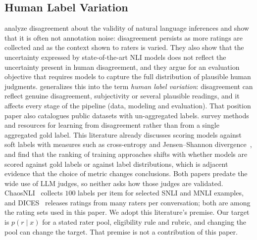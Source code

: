 \subsection{Human Label Variation}
\label{sec:supp-hlv}
\citet{pavlick2019inherent} analyze disagreement about the validity of natural language inferences and show that it is often not annotation noise: disagreement persists as more ratings are collected and as the context shown to raters is varied.
They also show that the uncertainty expressed by state-of-the-art NLI models does not reflect the uncertainty present in human disagreement, and they argue for an evaluation objective that requires models to capture the full distribution of plausible human judgments.
\citet{plank2022problem} generalizes this into the term \emph{human label variation}: disagreement can reflect genuine disagreement, subjectivity or several plausible readings, and it affects every stage of the pipeline (data, modeling and evaluation).
That position paper also catalogues public datasets with un-aggregated labels.
\citet{uma2021learning} survey methods and resources for learning from disagreement rather than from a single aggregated gold label.
This literature already discusses scoring models against soft labels with measures such as cross-entropy and Jensen--Shannon divergence~\citep{plank2022problem}, and \citet{uma2021learning} find that the ranking of training approaches shifts with whether models are scored against gold labels or against label distributions, which is adjacent evidence that the choice of metric changes conclusions.
Both papers predate the wide use of LLM judges, so neither asks how those judges are validated.
ChaosNLI~\citep{nie2020chaosnli} collects $100$ labels per item for selected SNLI and MNLI examples, and DICES~\citep{aroyo2023dices} releases ratings from many raters per conversation; both are among the rating sets used in this paper.
We adopt this literature's premise.
Our target is $p(r\mid x)$ for a stated rater pool, eligibility rule and rubric, and changing the pool can change the target.
That premise is not a contribution of this paper.

